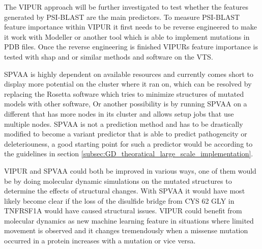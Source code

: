 The VIPUR approach will be further investigated to test whether the features generated by PSI-BLAST are the main predictors. To measure PSI-BLAST feature importance within VIPUR it first needs to be reverse engineered to make it work with Modeller or another tool which is able to implement mutations in PDB files. Once the reverse engineering is finished VIPURs feature importance is tested with shap\cite{slundberg_slundberg/shap:_nodate, strumbelj_explaining_2014, ribeiro_why_2016, shrikumar_learning_2017, datta_algorithmic_nodate, bach_pixel-wise_2015, datadive_interpreting_nodate} and or similar methods and software on the VTS.

SPVAA is highly dependent on available resources and currently comes short to display more potential on the cluster where it ran on, which can be resolved by replacing the Rosetta software which tries to minimize structures of mutated models with other software, Or another possibility is by running SPVAA on a different that has more nodes in its cluster and allows setup jobs that use multiple nodes. SPVAA is not a prediction method and has to be drastically modified to become a variant predictor that is able to predict pathogencity or deleteriouness, a good starting point for such a predictor would be according to the guidelines in section \ref{subsec:GD_theoratical_large_scale_implementation}.

VIPUR and SPVAA could both be improved in various ways, one of them would be by doing molecular dynamic simulations on the mutated structures to determine the effects of structural changes. With SPVAA it would have most likely become clear if the loss of the disulfide bridge from CYS 62 GLY  in TNFRSF1A would have caused structural issues. VIPUR could benefit from molecular dynamics as new machine learning feature in situations where limited movement is observed and it changes tremendously when a missense mutation occurred in a protein increases with a mutation or vice versa.



